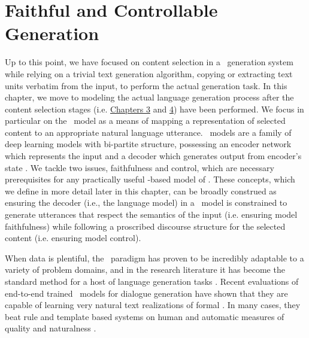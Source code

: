 \chapter{Faithful and Controllable Generation}
\label{ch:nlg}

Up to this point, we have  focused on content selection in a
\texttotext~generation system while relying on a trivial text generation
algorithm, copying or extracting text units verbatim from the input, to perform
the actual generation task.  In this chapter, we move to modeling the actual
language generation process after the content selection stages (i.e.
\hyperref[ch:dlsum]{Chapters 3} and \hyperref[ch:mlsum]{4}) have been
performed.  We focus in particular on the \sequencetosequence~model as a means
of mapping a representation of selected content to an appropriate natural
language utterance. \Sequencetosequence~models are a family of deep learning
models with bi-partite structure, possessing an encoder network which
represents the input and a decoder which generates output from encoder's state
\citep{sutskever2014}.  We tackle two issues, faithfulness and control, which
are necessary prerequisites for any practically useful
\sequencetosequence-based model of \naturallanguagegeneration.  These concepts,
which we define in more detail later in this chapter, can be broadly construed
as ensuring the decoder (i.e., the language model) in a
\sequencetosequence~model is constrained to generate utterances that respect
the semantics of the input (i.e. ensuring model faithfulness) while following a
proscribed discourse structure for the selected content (i.e. ensuring model
control).

When data is plentiful, the \sequencetosequence~paradigm has proven to be
incredibly adaptable to a variety of problem domains, and in the research
literature it has become the standard method for a host of language generation
tasks \citep{xu2015,dusek2016,vaswani2017,fan2018}.  Recent evaluations of
end-to-end trained \sequencetosequence~models for dialogue generation have
shown that they are capable of learning very natural text realizations of
formal \meaningrepresentation. In many cases, they  beat rule and template
based systems on human and automatic measures of quality and naturalness
\citep{dusek2020}.
 


